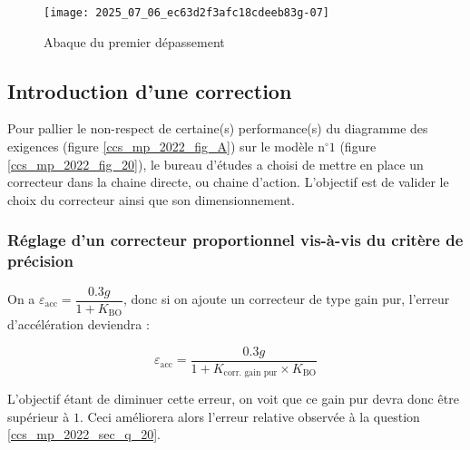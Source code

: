\ifprof
\else

\begin{figure}[!h]
\centering
\texttt{[image: 2025\_07\_06\_ec63d2f3afc18cdeeb83g-07]}
\caption{\label{ccs_mp_2022_fig_09}Abaque du premier dépassement}
\end{figure}
\fi


\subsection{Introduction d'une correction \label{ccs_mp_2022_sec_3B}}

\begin{obj}
Pour pallier le non-respect de certaine(s) performance(s) du diagramme des exigences (figure \ref{ccs_mp_2022_fig_A}) sur le modèle $\mathrm{n}^{\circ} 1$ (figure \ref{ccs_mp_2022_fig_20}), le bureau d'études a choisi de mettre en place un correcteur dans la chaine directe, ou chaine d'action. L'objectif est de valider le choix du correcteur ainsi que son dimensionnement.
\end{obj}

\subsubsection{Réglage d'un correcteur proportionnel vis-à-vis du critère de précision \label{ccs_mp_2022_sec_3B1}}

\ifprof
\begin{corrige}

On a $\varepsilon_\text{acc} =  \dfrac{0.3 g}{1+K_\text{BO}} $, donc si on ajoute un correcteur de type gain pur, l'erreur d'accélération deviendra :

$$\varepsilon_\text{acc} =  \dfrac{0.3 g}{1+ K_\text{corr. gain pur} \times K_\text{BO} } $$

 L'objectif étant de diminuer cette erreur, on voit que ce gain pur devra donc être supérieur à $1$. Ceci améliorera alors l'erreur relative observée à la question \ref{ccs_mp_2022_sec_q_20}.

\end{corrige}
\else
\fi


